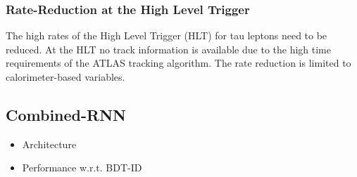 \subsubsection{Rate-Reduction at the High Level Trigger}
\label{sec:hlt_rate_reduction}

The high rates of the High Level Trigger (HLT) for tau leptons need to be
reduced. At the HLT no track information is available due to the high time
requirements of the ATLAS tracking algorithm. The rate reduction is limited to
calorimeter-based variables.

\subsection{Combined-RNN}
\label{sec:rnn_combined}



\begin{itemize}
\item Architecture
\item Performance w.r.t. BDT-ID
\end{itemize}


